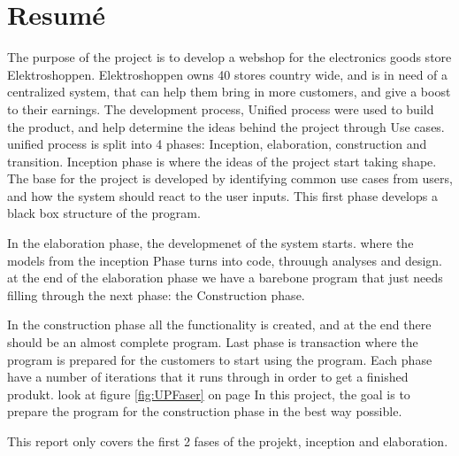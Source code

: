 \newpage
\section{Resumé}

The purpose of the project is to develop a webshop for the electronics goods store Elektroshoppen. Elektroshoppen owns 40 stores country wide, and is in need of a centralized system, that can help them bring in more customers, and give a boost to their earnings.
The development process, Unified process were used to build the product, and help determine the ideas behind the project through Use cases. unified process is split into 4 phases: Inception, elaboration, construction and transition. Inception phase is where the ideas of the project start taking shape. The base for the project is developed by identifying common use cases from users, and how the system should react to the user inputs. This first phase develops a black box structure of the program.

In the elaboration phase, the developmenet of the system starts. where the models from the inception Phase turns into code, throuugh analyses and design. at the end of the elaboration phase we have a barebone program that just needs filling through the next phase: the Construction phase.

In the construction phase all the functionality is created, and at the end there should be an almost complete program. Last phase is transaction where the program is prepared for the customers to start using the program. Each phase have a number of iterations that it runs through in order to get a finished produkt. look at figure \ref{fig:UPFaser} on page \pageref{fig:UPFaser}
In this project, the goal is to prepare the program for the construction phase in the best way possible.

This report only covers the first 2  fases of the projekt, inception and elaboration.